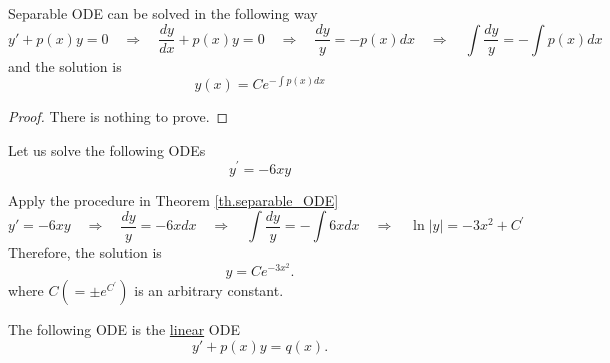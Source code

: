 \begin{theorem}[]\label{th.separable_ODE}
    Separable ODE can be solved in the following way
    \begin{equation*}
        y' + p(x)y = 0
        \quad\Rightarrow\quad \frac{dy}{dx} + p(x)y = 0 \quad\Rightarrow\quad \frac{dy}{y} = - p(x)dx
        \quad\Rightarrow\quad
        \int \frac{dy}{y} = - \int p(x)dx
    \end{equation*}
    and the solution is 
    \begin{equation}\label{eq.sol_separable}
        y(x) = Ce^{-\int p(x)dx}
    \end{equation}
\end{theorem}
\begin{proof}
    There is nothing to prove.
\end{proof}

\begin{example}[]
    Let us solve the following ODEs
    \begin{equation*}
        y^{\prime} = -6 x y
    \end{equation*}

    Apply the procedure in Theorem \ref{th.separable_ODE}
    \begin{equation*}
        y' = -6 x y
        \quad\Rightarrow\quad \frac{dy}{y} = -6 x dx
        \quad\Rightarrow\quad
        \int \frac{dy}{y} = - \int 6 x dx
        \quad\Rightarrow\quad
        \ln |y|=-3 x^2+C^{\prime}
    \end{equation*}
    Therefore, the solution is 
    \begin{equation*}
        y=C e^{-3 x^2}.
    \end{equation*}
    where $C(= \pm e^{C^{\prime}})$ is an arbitrary constant.
\end{example}

\begin{definition}
    The following ODE is the \underline{linear} ODE
    \begin{equation}\label{eq.linear}
        y' + p(x)y = q(x).
    \end{equation}
\end{definition}

